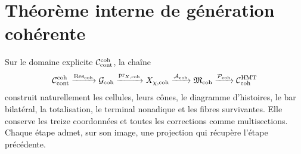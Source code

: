 \section{Théorème interne de génération cohérente}
\label{sec:pdfv2-coh-theorem}

\begin{theorem}
\label{thm:pdfv2-coh-internal-generation}
Sur le domaine explicite \(\mathcal C_{\rm cont}^{\rm coh}\), la chaîne
\[
 \mathcal C_{\rm cont}^{\rm coh}
 \xrightarrow{\operatorname{Res}_{\rm coh}}
 \mathcal G_{\rm coh}
 \xrightarrow{\operatorname{pr}_{X,{\rm coh}}}
 X_{\chi,{\rm coh}}
 \xrightarrow{\mathcal A_{\rm coh}}
 \mathfrak M_{\rm coh}
 \xrightarrow{\mathcal P_{\rm coh}}
 \mathcal C_{\rm coh}^{\rm HMT}
\]
construit naturellement les cellules, leurs cônes, le diagramme d'histoires, le
bar bilatéral, la totalisation, le terminal nonadique et les fibres
survivantes. Elle conserve les treize coordonnées et toutes les corrections comme
multisections. Chaque étape admet, sur son image, une projection qui récupère
l'étape précédente.
\end{theorem}

